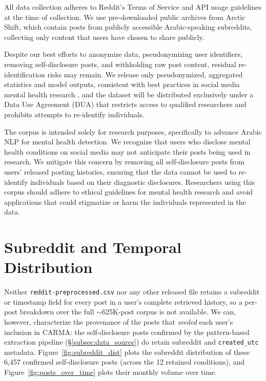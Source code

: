 \documentclass[11pt]{article}
\begin{document}
All data collection adheres to Reddit's Terms of Service and API usage guidelines at the time of collection. We use pre-downloaded public archives from Arctic Shift, which contain posts from publicly accessible Arabic-speaking subreddits, collecting only content that users have chosen to share publicly.

Despite our best efforts to anonymize data, pseudonymizing user identifiers, removing self-disclosure posts, and withholding raw post content, residual re-identification risks may remain. We release only pseudonymized, aggregated statistics and model outputs, consistent with best practices in social media mental health research \cite{harrigian2021state}, and the dataset will be distributed exclusively under a Data Use Agreement (DUA) that restricts access to qualified researchers and prohibits attempts to re-identify individuals.

The corpus is intended solely for research purposes, specifically to advance Arabic NLP for mental health detection. We recognize that users who disclose mental health conditions on social media may not anticipate their posts being used in research. We mitigate this concern by removing all self-disclosure posts from users' released posting histories, ensuring that the data cannot be used to re-identify individuals based on their diagnostic disclosures. Researchers using this corpus should adhere to ethical guidelines for mental health research and avoid applications that could stigmatize or harm the individuals represented in the data.


%


\appendix

\section{Subreddit and Temporal Distribution}
\label{app:subreddit_time}

Neither \texttt{reddit-preprocessed.csv} nor any other released file
retains a subreddit or timestamp field for every post in a user's
complete retrieved history, so a per-post breakdown over the full
$\sim$625K-post corpus is not available. We can, however, characterize
the provenance of the posts that \textit{seeded} each user's inclusion
in CARMA: the self-disclosure posts confirmed by the pattern-based
extraction pipeline (\S\ref{subsec:data_source}) do retain subreddit
and \texttt{created\_utc} metadata. Figure~\ref{fig:subreddit_dist}
plots the subreddit distribution of these 6,457 confirmed
self-disclosure posts (across the 12 retained conditions), and
Figure~\ref{fig:posts_over_time} plots their monthly volume over time.
\end{document}
